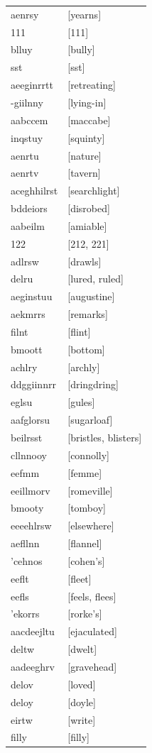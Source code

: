 \documentclass{article}
\begin{document}
\begin{tabular}{ll}
aenrsy & [yearns] \\
111 & [111] \\
blluy & [bully] \\
sst & [sst] \\
aeeginrrtt & [retreating] \\
-giilnny & [lying-in] \\
aabccem & [maccabe] \\
inqstuy & [squinty] \\
aenrtu & [nature] \\
aenrtv & [tavern] \\
aceghhilrst & [searchlight] \\
bddeiors & [disrobed] \\
aabeilm & [amiable] \\
122 & [212, 221] \\
adlrsw & [drawls] \\
delru & [lured, ruled] \\
aeginstuu & [augustine] \\
aekmrrs & [remarks] \\
filnt & [flint] \\
bmoott & [bottom] \\
achlry & [archly] \\
ddggiinnrr & [dringdring] \\
eglsu & [gules] \\
aafglorsu & [sugarloaf] \\
beilrsst & [bristles, blisters] \\
cllnnooy & [connolly] \\
eefmm & [femme] \\
eeillmorv & [romeville] \\
bmooty & [tomboy] \\
eeeehlrsw & [elsewhere] \\
aefllnn & [flannel] \\
'cehnos & [cohen's] \\
eeflt & [fleet] \\
eefls & [feels, flees] \\
'ekorrs & [rorke's] \\
aacdeejltu & [ejaculated] \\
deltw & [dwelt] \\
aadeeghrv & [gravehead] \\
delov & [loved] \\
deloy & [doyle] \\
eirtw & [write] \\
filly & [filly] \\

\end{tabular}
\end{document}
